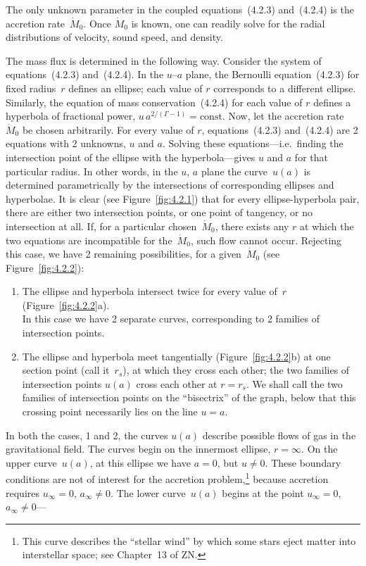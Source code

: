 The only unknown parameter in the coupled equations~(4.2.3) and~(4.2.4) is
the accretion rate~$\dot{M}_0$.  Once $\dot{M}_0$ is known, one can readily
solve for the radial distributions of velocity, sound speed, and density.

The mass flux is determined in the following way.  Consider the system of
equations~(4.2.3) and~(4.2.4).  In the $u$--$a$ plane, the Bernoulli
equation~(4.2.3) for fixed radius~$r$ defines an ellipse; each value of $r$
corresponds to a different ellipse.  Similarly, the equation of mass
conservation~(4.2.4) for each value of $r$ defines a hyperbola of fractional
power, $u\,a^{2/(\Gamma-1)} = \text{const}$.  Now, let the accretion
rate~$\dot{M}_0$ be chosen arbitrarily.  For every value of $r$,
equations~(4.2.3) and~(4.2.4) are 2 equations with 2 unknowns, $u$ and $a$.
Solving these equations---i.e.\ finding the intersection point of the ellipse
with the hyperbola---gives $u$ and $a$ for that particular radius.  In other
words, in the $u$, $a$ plane the curve~$u(a)$ is determined parametrically by
the intersections of corresponding ellipses and hyperbolae.  It is clear (see
Figure~\ref{fig:4.2.1}) that for every ellipse-hyperbola pair, there are
either two intersection points, or one point of tangency, or no intersection
at all.  If, for a particular chosen~$\dot{M}_0$, there exists any $r$ at
which the two equations are incompatible for the~$\dot{M}_0$, such flow
cannot occur.  Rejecting this case, we have 2 remaining possibilities, for a
given~$\dot{M}_0$ (see Figure~\ref{fig:4.2.2}):

\begin{enumerate}
\item The ellipse and hyperbola intersect twice for every value of~$r$
  (Figure~\ref{fig:4.2.2}a).\\
  In this case we have 2 separate curves, corresponding to 2 families of
  intersection points.

\item The ellipse and hyperbola meet tangentially
  (Figure~\ref{fig:4.2.2}b) at one section point (call it~$r_s$), at which
  they cross each other; the two families of intersection points $u(a)$
  cross each other at $r = r_s$.  We shall call the two families of
  intersection points on the ``bisectrix'' of the graph, below that this
  crossing point necessarily lies on the line $u = a$.
\end{enumerate}

In both the cases, 1 and 2, the curves $u(a)$ describe possible flows of gas
in the gravitational field.  The curves begin on the innermost ellipse,
$r = \infty$.  On the upper curve~$u(a)$, at this ellipse we have $a = 0$,
but $u \neq 0$.  These boundary conditions are not of interest for the
accretion problem,\footnote{This curve describes the ``stellar wind'' by
which some stars eject matter into interstellar space; see Chapter~13 of
ZN.} because accretion requires $u_\infty = 0$,
$a_\infty \neq 0$.  The lower curve~$u(a)$ begins at the point
$u_\infty = 0$, $a_\infty \neq 0$---

